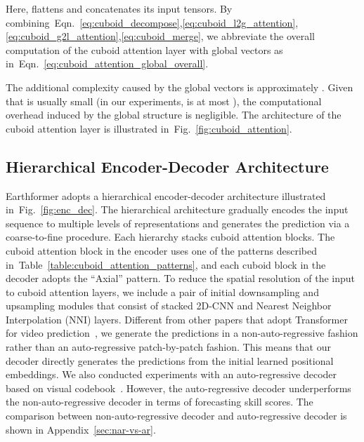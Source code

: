 \documentclass{article}
\newcommand{\tabref}[1]{Table~\ref{#1}}
\newcommand{\figref}[1]{Fig.~\ref{#1}}
\newcommand{\eqnref}[1]{Eqn.~\ref{#1}}
\begin{document}
Here,  flattens and concatenates its input tensors. 
By combining~\eqnref{eq:cuboid_decompose},\ref{eq:cuboid_l2g_attention},\ref{eq:cuboid_g2l_attention},\ref{eq:cuboid_merge}, we abbreviate the overall computation of the cuboid attention layer with global vectors as in~\eqnref{eq:cuboid_attention_global_overall}.

The additional complexity caused by the global vectors is approximately . Given that  is usually small (in our experiments,  is at most ), the computational overhead induced by the global structure is negligible. The architecture of the cuboid attention layer is illustrated in~\figref{fig:cuboid_attention}.



\subsection{Hierarchical Encoder-Decoder Architecture}
\label{sec:hierarchical_enc_dec}

Earthformer adopts a hierarchical encoder-decoder architecture illustrated in~\figref{fig:enc_dec}. The hierarchical architecture gradually encodes the input sequence to multiple levels of representations and generates the prediction via a coarse-to-fine procedure. Each hierarchy stacks  cuboid attention blocks. The cuboid attention block in the encoder uses one of the patterns described in~\tabref{table:cuboid_attention_patterns}, and each cuboid block in the decoder adopts the ``Axial'' pattern. To reduce the spatial resolution of the input to cuboid attention layers, we include a pair of initial downsampling and upsampling modules that consist of stacked 2D-CNN and Nearest Neighbor Interpolation (NNI) layers.
Different from other papers that adopt Transformer for video prediction~\cite{ho2019axial, rakhimov2020latent}, we generate the predictions in a non-auto-regressive fashion rather than an auto-regressive patch-by-patch fashion. This means that our decoder directly generates the predictions from the initial learned positional embeddings. We also conducted experiments with an auto-regressive decoder based on visual codebook~\cite{razavi2019generating}. However, the auto-regressive decoder underperforms the non-auto-regressive decoder in terms of forecasting skill scores. The comparison between non-auto-regressive decoder and auto-regressive decoder is shown in Appendix~\ref{sec:nar-vs-ar}.
\end{document}
